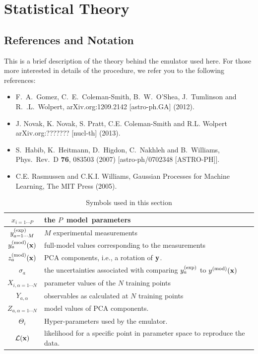 \section{Statistical Theory}
\subsection{References and Notation}

This is a brief description of the theory behind the emulator used here. For those more interested in details of the procedure, we refer you to the following references:
\begin{itemize}
\item F.~A.~Gomez, C.~E.~Coleman-Smith, B.~W.~O'Shea, J.~Tumlinson and R.~.L.~Wolpert,
  arXiv.org:1209.2142 [astro-ph.GA] (2012).
\item J. Novak, K. Novak, S. Pratt, C.E. Coleman-Smith and R.L. Wolpert
  arXiv.org:??????? [nucl-th] (2013).
\item S.~Habib, K.~Heitmann, D.~Higdon, C.~Nakhleh and B.~Williams,
  Phys.\ Rev.\ D {\bf 76}, 083503 (2007)
  [astro-ph/0702348 [ASTRO-PH]].
\item C.E. Rasmussen and C.K.I.  Williams, Gaussian Processes for Machine Learning, The MIT Press (2005).
\end{itemize}
\begin{table}[ht]
\begin{center}
\caption{Symbols used in this section}
\begin{tabular}{|c|l|}
\hline
$x_{i=1\cdots P}$& the $P$~{\rm model~parameters}\\
\hline
$y^{\rm(exp)}_{a=1\cdots M}$ & $M$ experimental measurements\\
\hline
$y^{\rm(mod)}_a({\bf x})$ & full-model values corresponding to the measurements\\
\hline
$z^{\rm(mod)}_a({\bf x})$ & PCA components, i.e., a rotation of ${\bf y}$.\\
\hline
$\sigma_a$ & the uncertainties associated with comparing $y^{\rm(exp)}_a$ to $y^{\rm(mod)}({\bf x})$\\
\hline
$X_{i,\alpha=1\cdots N}$ & parameter values of the $N$ training points\\
\hline
$Y_{a,\alpha}$ & observables as calculated at $N$ training points\\
\hline
$Z_{a,\alpha=1\cdots N}$ & model values of PCA components.\\
\hline
$\Theta_i$ & Hyper-parameters used by the emulator.\\
\hline
${\mathcal L}({\bf x})$ & likelihood for a specific point in parameter space to reproduce the data.\\
\hline
\end{tabular}
\end{center}
\end{table}

